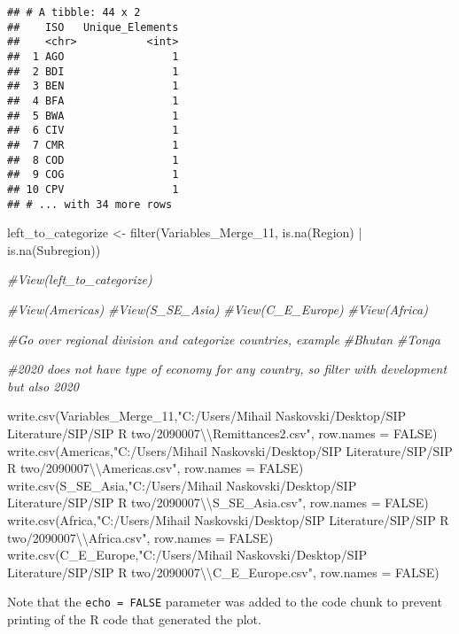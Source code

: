 \documentclass[
]{article}
\newenvironment{Shaded}{\begin{snugshade}}{\end{snugshade}}
\newcommand{\AttributeTok}[1]{\textcolor[rgb]{0.77,0.63,0.00}{#1}}
\newcommand{\CommentTok}[1]{\textcolor[rgb]{0.56,0.35,0.01}{\textit{#1}}}
\newcommand{\ConstantTok}[1]{\textcolor[rgb]{0.00,0.00,0.00}{#1}}
\newcommand{\FunctionTok}[1]{\textcolor[rgb]{0.00,0.00,0.00}{#1}}
\newcommand{\NormalTok}[1]{#1}
\newcommand{\OtherTok}[1]{\textcolor[rgb]{0.56,0.35,0.01}{#1}}
\newcommand{\SpecialCharTok}[1]{\textcolor[rgb]{0.00,0.00,0.00}{#1}}
\newcommand{\StringTok}[1]{\textcolor[rgb]{0.31,0.60,0.02}{#1}}
\begin{document}
\begin{verbatim}
## # A tibble: 44 x 2
##    ISO   Unique_Elements
##    <chr>           <int>
##  1 AGO                 1
##  2 BDI                 1
##  3 BEN                 1
##  4 BFA                 1
##  5 BWA                 1
##  6 CIV                 1
##  7 CMR                 1
##  8 COD                 1
##  9 COG                 1
## 10 CPV                 1
## # ... with 34 more rows
\end{verbatim}

\begin{Shaded}
\begin{Highlighting}[]
\NormalTok{left\_to\_categorize }\OtherTok{\textless{}{-}} \FunctionTok{filter}\NormalTok{(Variables\_Merge\_11, }\FunctionTok{is.na}\NormalTok{(Region) }\SpecialCharTok{|} \FunctionTok{is.na}\NormalTok{(Subregion))}


\CommentTok{\#View(left\_to\_categorize)}

\CommentTok{\#View(Americas)}
\CommentTok{\#View(S\_SE\_Asia)}
\CommentTok{\#View(C\_E\_Europe)}
\CommentTok{\#View(Africa)}

\CommentTok{\#Go over regional division and categorize countries, example}
\CommentTok{\#Bhutan}
\CommentTok{\#Tonga}


\CommentTok{\#2020 does not have type of economy for any country, so filter with development but also 2020}

\FunctionTok{write.csv}\NormalTok{(Variables\_Merge\_11,}\StringTok{"C:/Users/Mihail Naskovski/Desktop/SIP Literature/SIP/SIP R two/2090007}\SpecialCharTok{\textbackslash{}\textbackslash{}}\StringTok{Remittances2.csv"}\NormalTok{, }\AttributeTok{row.names =} \ConstantTok{FALSE}\NormalTok{)}
\FunctionTok{write.csv}\NormalTok{(Americas,}\StringTok{"C:/Users/Mihail Naskovski/Desktop/SIP Literature/SIP/SIP R two/2090007}\SpecialCharTok{\textbackslash{}\textbackslash{}}\StringTok{Americas.csv"}\NormalTok{, }\AttributeTok{row.names =} \ConstantTok{FALSE}\NormalTok{)}
\FunctionTok{write.csv}\NormalTok{(S\_SE\_Asia,}\StringTok{"C:/Users/Mihail Naskovski/Desktop/SIP Literature/SIP/SIP R two/2090007}\SpecialCharTok{\textbackslash{}\textbackslash{}}\StringTok{S\_SE\_Asia.csv"}\NormalTok{, }\AttributeTok{row.names =} \ConstantTok{FALSE}\NormalTok{)}
\FunctionTok{write.csv}\NormalTok{(Africa,}\StringTok{"C:/Users/Mihail Naskovski/Desktop/SIP Literature/SIP/SIP R two/2090007}\SpecialCharTok{\textbackslash{}\textbackslash{}}\StringTok{Africa.csv"}\NormalTok{, }\AttributeTok{row.names =} \ConstantTok{FALSE}\NormalTok{)}
\FunctionTok{write.csv}\NormalTok{(C\_E\_Europe,}\StringTok{"C:/Users/Mihail Naskovski/Desktop/SIP Literature/SIP/SIP R two/2090007}\SpecialCharTok{\textbackslash{}\textbackslash{}}\StringTok{C\_E\_Europe.csv"}\NormalTok{, }\AttributeTok{row.names =} \ConstantTok{FALSE}\NormalTok{)}
\end{Highlighting}
\end{Shaded}

Note that the \texttt{echo\ =\ FALSE} parameter was added to the code
chunk to prevent printing of the R code that generated the plot.
\end{document}
